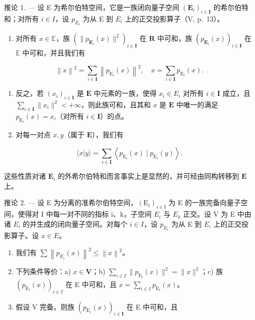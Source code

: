 推论 1. --- 设 E 为希尔伯特空间，它是一族闭向量子空间 \((\mathbf{E}_{i})_{i\in\mathbf{I}}\) 的希尔伯特和；对所有 \(i\in I\)，设 \(p_{E_{i}}\) 为从 E 到 \(E_{i}\) 上的正交投影算子（V, p.~13）。

\begin{enumerate}
\def\labelenumi{\alph{enumi})}
\tightlist
\item
  对所有 \(x \in \mathbb{E}\)，族 \((\| p_{\mathbf{E}_i}(x)\|^{2})_{i\in \mathbf{I}}\) 在 \(\mathbf{R}\) 中可和，族 \((p_{\mathbf{E}_i}(x))_{i\in \mathbf{I}}\) 在 \(\mathbb{E}\) 中可和，并且我们有
\end{enumerate}

\[
\left\| x \right\| ^ {2} = \sum_ {i \in \mathbf {I}} \left\| p _ {\mathrm{E} _ {i}} (x) \right\| ^ {2}, \quad x = \sum_ {i \in \mathbf {I}} p _ {\mathrm{E} _ {i}} (x).
\]

\begin{enumerate}
\def\labelenumi{\alph{enumi})}
\setcounter{enumi}{1}
\item
  反之，若 \((x_{i})_{i\in \mathbf{I}}\) 是 \(\mathbf{E}\) 中元素的一族，使得 \(x_{i}\in E_{i}\) 对所有 \(i\in \mathbf{I}\) 成立，且 \(\sum_{i\in \mathbf{I}}\| x_i\|^2 < + \infty\)，则此族可和，且其和 \(x\) 是 \(\mathbf{E}\) 中唯一的满足 \(p_{\mathrm{E}_i}(x) = x_i\)（对所有 \(i\in \mathbf{I}\)）的点。
\item
  对每一对点 \(x, y\)（属于 \(\mathbf{E}\)），我们有
\end{enumerate}

\[
\langle x | y \rangle = \sum_ {i \in \mathbf {I}} \left\langle p _ {\mathrm{E} _ {i}} (x) \mid p _ {\mathrm{E} _ {i}} (y) \right\rangle .
\]

这些性质对诸 \(\mathbf{E}_i\) 的外希尔伯特和而言事实上是显然的，并可经由同构转移到 \(\mathbf{E}\) 上。

推论 2. --- 设 E 为分离的准希尔伯特空间，\((\mathrm{E}_{i})_{i\in\mathrm{I}}\) 为 E 的一族完备向量子空间，使得对 I 中每一对不同的指标 i、k，子空间 \(E_{i}\) 与 \(E_{k}\) 正交。设 V 为 E 中由诸 \(E_{i}\) 的并生成的闭向量子空间。对每个 \(i\in I\)，设 \(p_{E_{i}}\) 为从 E 到 \(E_{i}\) 上的正交投影算子。设 \(x\in E\)。

\begin{enumerate}
\def\labelenumi{\arabic{enumi})}
\item
  我们有 \(\sum\left\|p_{E_{i}}(x)\right\|^{2}\leqslant\left\|x\right\|^{2}\)。
\item
  下列条件等价：a) \(x \in \mathbf{V}\)；b) \(\sum_{i \in I} \| p_{\mathrm{E}_i}(x) \|^2 = \| x \|^2\)；c) 族 \((p_{\mathrm{E}_i}(x))_{i \in I}\) 在 E 中可和，且 \(x = \sum_{i \in I} p_{\mathrm{E}_i}(x)\)。
\item
  假设 V 完备。则族 \((p_{\mathrm{E}_i}(x))_{i\in \mathbf{I}}\) 在 E 中可和，且
\end{enumerate}

